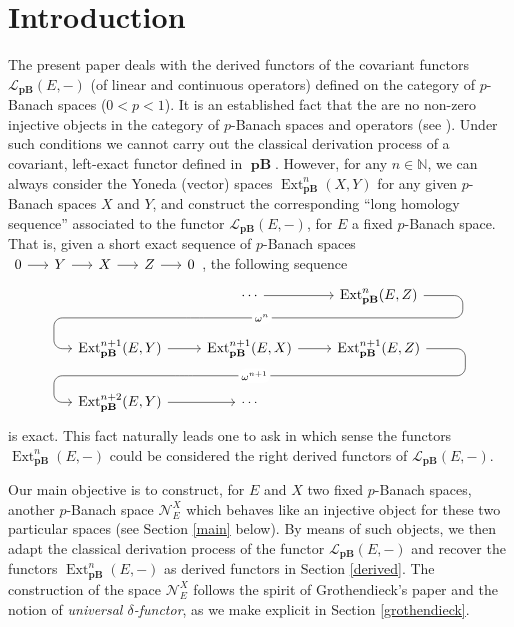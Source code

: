 \documentclass[12pt,a4paper]{amsproc}
\theoremstyle{remark}
\theoremstyle{definition}
\newcommand{\Ext}{\operatorname{Ext}}
\newcommand{\pBan}{\operatorname{\textbf{pB}}}
\numberwithin{equation}{section}
\begin{document}
	\section{Introduction}
	The present paper deals with the derived functors of the covariant functors $\mathcal L_{\pBan}(E,-)$ (of linear and continuous operators) defined on the category of $p$-Banach spaces ($0<p<1$). It is an established fact that the are no non-zero injective objects in the category of $p$-Banach spaces and operators (see \cite[2.9.1]{hmbst}). Under such conditions we cannot carry out the classical derivation process of a covariant, left-exact functor defined in $\pBan$. However, for any $n\in \mathbb N$, we can always consider the Yoneda (vector) spaces $\Ext^n_{\pBan}(X,Y)$ for any given $p$-Banach spaces $X$ and $Y$, and construct the corresponding ``long homology sequence'' associated to the functor $\mathcal{L}_{\pBan}(E,-)$, for $E$ a fixed $p$-Banach space. That is, given a short exact sequence of $p$-Banach spaces $\begin{tikzcd}[column sep=1.5em] 0 \arrow[r] & Y \arrow[r] & X \arrow[r] & Z \arrow[r] & 0\end{tikzcd}$, the following sequence
	\begin{equation}
		\label{eq:longhomology}
		\begin{tikzcd}
			& \cdots \arrow[r] 			\arrow[dl, phantom, ""{coordinate, name=Z}]                    & {\Ext_{\pBan}^n(E,Z)} \arrow[dll,
			"\omega^n" description, rounded corners=6pt,
			to path={ -- ([xshift=6.5ex]\tikztostart.east)
				|- (Z) [very near end] \tikztonodes
				-| ([xshift=-3ex]\tikztotarget.west)
				-- (\tikztotarget)}]        \\
			{\Ext_{\pBan}^{n+1}(E,Y)} \arrow[r] & {\Ext_{\pBan}^{n+1}(E,X)} \arrow[r] \arrow[dl, phantom, ""{coordinate, name=ZZ}] & {\Ext_{\pBan}^{n+1}(E,Z)} \arrow[dll,
			"\omega^{n+1}" description, rounded corners=6pt,
			to path={ -- ([xshift=6.5ex]\tikztostart.east)
				|- (ZZ) [very near end] \tikztonodes
				-| ([xshift=-3ex]\tikztotarget.west)
				-- (\tikztotarget)}]  \\
			{\Ext_{\pBan}^{n+2}(E,Y)} \arrow[r] & \cdots                              &
		\end{tikzcd}
	\end{equation}
	is exact. This fact naturally leads one to ask in which sense the functors $\Ext^n_{\pBan}(E,-)$ could be considered the right derived functors of $\mathcal{L}_{\pBan}(E,-)$. 
	\par Our main objective is to construct, for $E$ and $X$ two fixed $p$-Banach spaces, another $p$-Banach space $\mathcal N_E^X$ which behaves like an injective object for these two particular spaces (see Section \ref{main} below). By means of such objects, we then adapt the classical derivation process of the functor $\mathcal{L}_{\pBan}(E,-)$ and recover the functors $\Ext^n_{\pBan}(E,-)$ as derived functors in Section \ref{derived}. The construction of the space $\mathcal N_E^X$ follows the spirit of Grothendieck's paper \cite{tohoku} and the notion of \emph{universal $\delta$-functor}, as we make explicit in Section \ref{grothendieck}.
\end{document}
